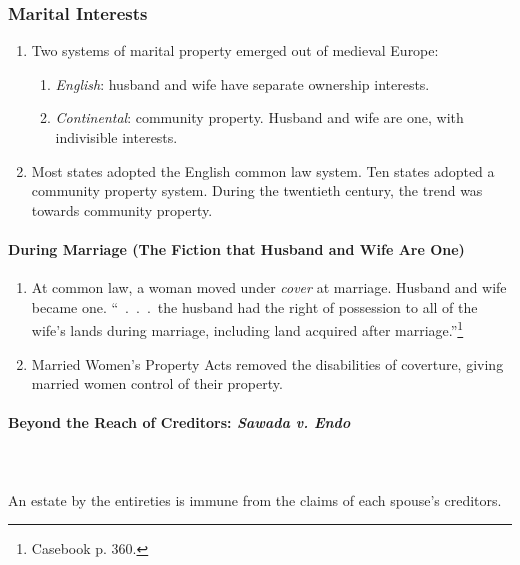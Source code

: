 
\subsubsection{Marital Interests}

\begin{enumerate}
    \item Two systems of marital property emerged out of medieval Europe:
    \begin{enumerate}
        \item \emph{English}: husband and wife have separate ownership 
        interests.
        \item \emph{Continental}: community property. Husband and wife are 
        one, with indivisible interests.
    \end{enumerate}
    \item Most states adopted the English common law system. Ten states 
    adopted a community property system. During the twentieth century, the 
    trend was towards community property.
\end{enumerate}

\paragraph{During Marriage (The Fiction that Husband and Wife Are One)}

\begin{enumerate}
    \item At common law, a woman moved under \emph{cover} at marriage. Husband 
    and wife became one. ``~.~.~.~the husband had the right of possession to 
    all of the wife's lands during marriage, including land acquired after 
    marriage.''\footnote{Casebook p. 360.}
    \item Married Women's Property Acts removed the disabilities of coverture, 
    giving married women control of their property.
\end{enumerate}

\paragraph{Beyond the Reach of Creditors: \emph{Sawada v. Endo}}
~\\\\
An estate by the entireties is immune from the claims of each spouse's 
creditors.

